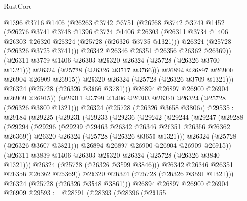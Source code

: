 \begin{lexlean}{RustCore}
\begin{coremodule}
                  @1396
                  @3716
                  @1406
                  (@26263
                    @3742
                    @3751
                    (@26268
                      @3742
                      @3749
                      @1452
                      (@26276
                        @3741
                        @3748
                        @1396
                        @3724
                        @1406
                        @26303
                        (@26311 @3734 @1406 @26303 @26320 @26324 (@25728 (@26326 @3735 @1321)))
                        @26324
                        (@25728 (@26326 @3725 @3741)))
                      @26342
                      @26346
                      @26351
                      @26356
                      @26362
                      @26369))
                  (@26311 @3759 @1406 @26303 @26320 @26324 (@25728 (@26326 @3760 @1321)))
                  @26324
                  (@25728 (@26326 @3717 @3766)))
                @26894
                @26897
                @26900
                @26904
                @26909
                @26915))
            @26320
            @26324
            (@25728 (@26326 @3709 @1321)))
          @26324
          (@25728 (@26326 @3666 @3781)))
        @26894
        @26897
        @26900
        @26904
        @26909
        @26915))
    (@26311 @3799 @1406 @26303 @26320 @26324 (@25728 (@26326 @3800 @1321)))
    @26324
    (@25728 (@26326 @3658 @3806))
@29535 := @29184
    (@29225
      (@29231
        (@29233
          (@29236
            (@29242
              (@29244
                (@29247
                  (@29288
                    (@29294
                      (@29296 (@29299 @29463 @26342 @26346 @26351 @26356 @26362 @26369))
                      @26320
                      @26324
                      (@25728 (@26326 @3650 @1321)))
                    @26324
                    (@25728 (@26326 @3607 @3821)))
                  @26894
                  @26897
                  @26900
                  @26904
                  @26909
                  @26915))
              (@26311 @3839 @1406 @26303 @26320 @26324 (@25728 (@26326 @3840 @1321)))
              @26324
              (@25728 (@26326 @3599 @3846)))
            @26342
            @26346
            @26351
            @26356
            @26362
            @26369))
        @26320
        @26324
        (@25728 (@26326 @3591 @1321)))
      @26324
      (@25728 (@26326 @3548 @3861)))
    @26894
    @26897
    @26900
    @26904
    @26909
@29593 := @28391
    (@28393
      (@28396
        (@29155

\end{coremodule}
\end{lexlean}
